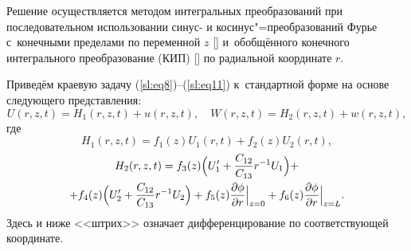 Решение осуществляется методом интегральных преобразований при последовательном использовании синус- и косинус"=преобразований Фурье с~конечными 
пределами по переменной $z$ [] и~обобщённого конечного интегрального преобразование (КИП) [] по радиальной координате $r$.

Приведём краевую задачу (\ref{sl:eq8})--(\ref{sl:eq11}) к~стандартной форме на основе следующего представления:
\begin{equation}
\label{sl:eq22}
U(r, z, t)=H_1 (r, z, t)+u(r, z, t), \quad W(r, z, t)=H_2 (r, z, t)+w(r, z, t), 
\end{equation}
где $$H_1 (r, z, t)=f_1 (z)U_1 (r, t)+f_2 (z)U_2 (r,  t),$$ 
\begin{multline*}
H_2 (r, z, t)=f_3 (z)\Bigl(U_1 ' +\frac{C_{12} }{C_{13} }r^{-1}U_1 \Bigr)+ \\+
f_4 (z)\Bigl(U_2 ' +\frac{C_{12} }{C_{13} }r^{-1}U_2  \Bigr)+
f_5 (z)\frac{\partial \phi }{\partial r}\Big|_{z=0} +f_6 (z)\frac{\partial \phi }{\partial r}\Big|_{z=L} .
\end{multline*}
Здесь и ниже <<штрих>> означает дифференцирование по соответствующей координате.

